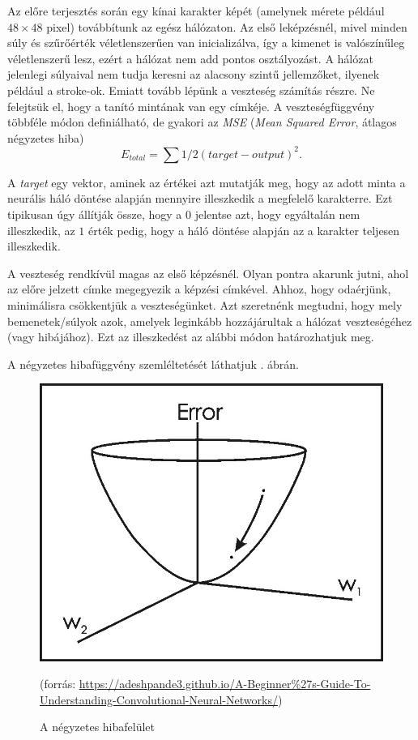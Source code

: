 Az előre terjesztés során egy kínai karakter képét (amelynek mérete például $48 \times 48$ pixel) továbbítunk az egész hálózaton. Az első leképzésnél, mivel minden súly és szűrőérték véletlenszerűen van inicializálva, így a kimenet is valószínűleg véletlenszerű lesz, ezért a hálózat nem add pontos osztályozást. A hálózat jelenlegi súlyaival nem tudja keresni az alacsony szintű jellemzőket, ilyenek például a stroke-ok. Emiatt tovább lépünk a veszteség számítás részre. Ne felejtsük el, hogy a tanító mintának van egy címkéje. A veszteségfüggvény többféle módon definiálható, de gyakori az \textit{MSE} (\textit{Mean Squared Error}, átlagos négyzetes hiba)
$$
E_{total} = \sum 1/2(target - output)^2.
$$ 

A \textit{target} egy vektor, aminek az értékei azt mutatják meg, hogy az adott minta a neurális háló döntése alapján mennyire illeszkedik a megfelelő karakterre. Ezt tipikusan úgy állítják össze, hogy a $0$ jelentse azt, hogy egyáltalán nem illeszkedik, az $1$ érték pedig, hogy a háló döntése alapján az a karakter teljesen illeszkedik.


A veszteség rendkívül magas az első képzésnél. Olyan pontra akarunk jutni, ahol az előre jelzett címke megegyezik a képzési címkével. Ahhoz, hogy odaérjünk, minimálisra csökkentjük a veszteségünket. Azt szeretnénk megtudni, hogy mely bemenetek/súlyok azok, amelyek leginkább hozzájárultak a hálózat veszteségéhez (vagy hibájához). Ezt az illeszkedést az alábbi módon határozhatjuk meg.

A négyzetes hibafüggvény szemléltetését láthatjuk . ábrán.

\begin{figure}[h]
\centering
\includegraphics[scale=0.4]{images/CNN_loss}
\caption{A négyzetes hibafelület}
(forrás: \url{https://adeshpande3.github.io/A-Beginner%27s-Guide-To-Understanding-Convolutional-Neural-Networks/})
\label{fig:CNN_loss}
\end{figure}

